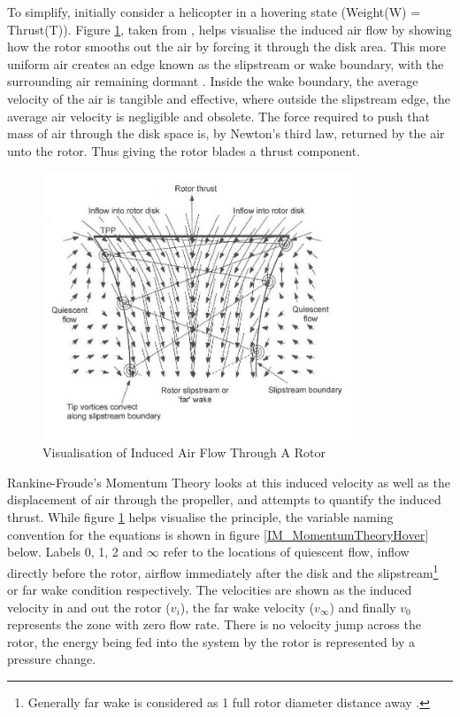 To simplify, initially consider a helicopter in a hovering state (Weight(W) = Thrust(T)). Figure \ref{IM_MomentumTheoryAirFlow}, taken from \cite{Leishman}, helps visualise the induced air flow by showing how the rotor smooths out the air by forcing it through the disk area. This more uniform air creates an edge known as the slipstream or wake boundary, with the surrounding air remaining dormant \cite{Leishman}. Inside the wake boundary, the average velocity of the air is tangible and effective, where outside the slipstream edge, the average air velocity is negligible and obsolete. The force required to push that mass of air through the disk space is, by Newton's third law, returned by the air unto the rotor. Thus giving the rotor blades a thrust component.
  
\begin{figure}[h]
\centering
\includegraphics[height = 8cm]{Images/Literature/MomentumTheoryAirFlow}	
\caption{Visualisation of Induced Air Flow Through A Rotor \cite{Leishman}}
\label{IM_MomentumTheoryAirFlow}
\end{figure}

Rankine-Froude's Momentum Theory looks at this induced velocity as well as the displacement of air through the propeller, and attempts to quantify the induced thrust. While figure \ref{IM_MomentumTheoryAirFlow} helps visualise the principle, the variable naming convention for the equations is shown in figure \ref{IM_MomentumTheoryHover} below. 
Labels 0, 1, 2 and $\infty$ refer to the locations of quiescent flow, inflow directly before the rotor, airflow immediately after the disk and the slipstream\footnote{Generally far wake is considered as 1 full rotor diameter distance away \cite{Leishman}.} or far wake condition respectively.
The velocities are shown as the induced velocity in and out the rotor ($v_{i}$), the far wake velocity ($v_{\infty}$) and finally $v_{0}$ represents the zone with zero flow rate. There is no velocity jump across the rotor, the energy being fed into the system by the rotor is represented by a pressure change.


